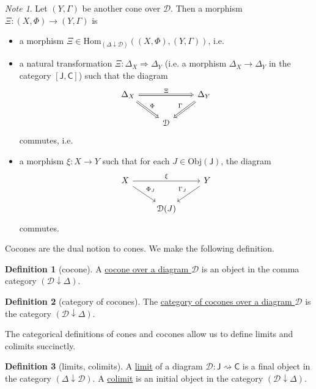 \documentclass[a4paper,10pt]{scrreprt}
\newcommand{\defn}[1]{\ul{#1}}
\newcommand{\Obj}{\mathrm{Obj}}
\newcommand{\Hom}{\mathrm{Hom}}
\theoremstyle{definition}
\newtheorem{definition}{Definition}[section]
\theoremstyle{plain}
\theoremstyle{remark}
\newtheorem{note}{Note}[section]
\begin{document}
\begin{note}
  Let $(Y, \Gamma)$ be another cone over $\mathcal{D}$. Then a morphism $\Xi\colon (X, \Phi) \to (Y, \Gamma)$ is 
  \begin{itemize}
    \item a morphism $\Xi \in \Hom_{(\Delta \downarrow \mathcal{D})}((X, \Phi), (Y, \Gamma))$, i.e.
    \item a natural transformation $\Xi\colon \Delta_{X} \Rightarrow \Delta_{Y}$ (i.e. a morphism $\Delta_{X} \to \Delta_{Y}$ in the category $[\mathsf{J}, \mathsf{C}]$) such that the diagram
      \begin{equation*}
        \begin{tikzcd}
          \Delta_{X}
          \arrow[rr, Rightarrow, "\Xi"]
          \arrow[rd, Rightarrow, "\Phi"]
          & &  \Delta_{Y}
          \arrow[ld, swap, Rightarrow, "\Gamma"]
          \\
          & \mathcal{D}
        \end{tikzcd}
      \end{equation*}
      commutes, i.e.
    \item a morphism $\xi\colon X \to Y$ such that for each $J \in \Obj(\mathsf{J})$, the diagram
      \begin{equation*}
        \begin{tikzcd}
          X
          \arrow[rr, "\xi"]
          \arrow[rd, "\Phi_{J}"]
          & & Y
          \arrow[ld, swap, "\Gamma_{J}"]
          \\
          & \mathcal{D}(J)
        \end{tikzcd}
      \end{equation*}
      commutes.
  \end{itemize}
\end{note}

Cocones are the dual notion to cones. We make the following definition.
\begin{definition}[cocone]
  \label{def:cocone}
  A \defn{cocone over a diagram $\mathcal{D}$} is an object in the comma category $(\mathcal{D} \downarrow \Delta)$.
\end{definition}

\begin{definition}[category of cocones]
  \label{def:categoryofcocones}
  The \defn{category of cocones over a diagram $\mathcal{D}$} is the category $(\mathcal{D} \downarrow \Delta)$.
\end{definition}

The categorical definitions of cones and cocones allow us to define limits and colimits succinctly.
\begin{definition}[limits, colimits]
  \label{def:limitscolimits}
  A \defn{limit} of a diagram $\mathcal{D}\colon \mathsf{J} \rightsquigarrow \mathsf{C}$ is a final object in the category $(\Delta \downarrow \mathcal{D})$. A \defn{colimit} is an initial object in the category $(\mathcal{D} \downarrow \Delta)$.
\end{definition}
\end{document}

